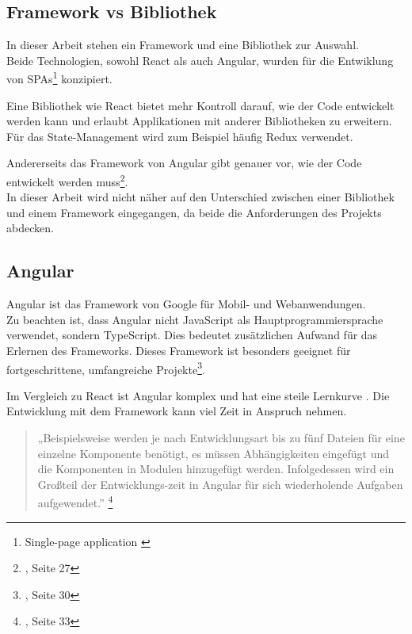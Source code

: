 \subsection{Framework vs Bibliothek}
\begin{flushleft}
In dieser Arbeit stehen ein Framework und eine Bibliothek zur Auswahl.
\\
Beide Technologien, sowohl React als auch Angular, wurden für die Entwiklung von SPAs\footnote{Single-page application {\cite{MO1}}} konzipiert.

Eine Bibliothek wie React bietet mehr Kontroll darauf, wie der Code entwickelt werden kann und erlaubt Applikationen mit anderer Bibliotheken zu erweitern. Für das State-Management wird zum Beispiel häufig Redux{\cite{RE1}} verwendet.

Andererseits das Framework von Angular gibt genauer vor, wie der Code entwickelt werden muss\footnote{{\cite{AN1}}, Seite 27}.
\\
In dieser Arbeit wird nicht näher auf den Unterschied zwischen einer Bibliothek und einem Framework eingegangen, da beide die Anforderungen des Projekts abdecken.
\end{flushleft}

\subsection{Angular}
Angular ist das Framework von Google für Mobil- und Webanwendungen.
\\


Zu beachten ist, dass Angular nicht JavaScript als Hauptprogrammiersprache verwendet, sondern TypeScript. Dies bedeutet zusätzlichen Aufwand für das Erlernen des Frameworks. Dieses Framework ist besonders geeignet für fortgeschrittene, umfangreiche Projekte\footnote{{\cite{AN1}}, Seite 30}.

Im Vergleich zu React ist Angular komplex und hat eine steile Lernkurve {\cite{E01}}. Die Entwicklung mit dem Framework kann viel Zeit in Anspruch nehmen.
\begin{quote}
  „Beispielsweise werden je nach Entwicklungsart bis zu fünf Dateien für eine einzelne Komponente benötigt, es müssen Abhängigkeiten eingefügt und die Komponenten in Modulen hinzugefügt werden. Infolgedessen wird ein Großteil der Entwicklungs-zeit in Angular für sich wiederholende Aufgaben aufgewendet.” 
  \footnote{{\cite{AN1}, Seite 33}}
    \end{quote}

